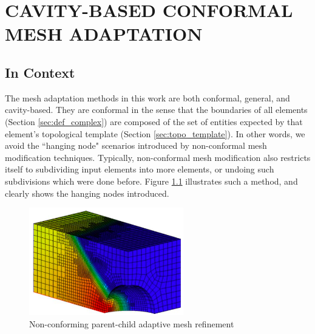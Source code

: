 
\chapter{CAVITY-BASED CONFORMAL MESH ADAPTATION}
\label{chap:adapt}

\section{In Context}

The mesh adaptation methods in this work are both
conformal, general, and cavity-based.
They are conformal in the sense that the boundaries of all
elements (Section \ref{sec:def_complex}) are composed
of the set of entities expected by that element's
topological template (Section \ref{sec:topo_template}).
In other words, we avoid the ``hanging node" scenarios
introduced by non-conformal mesh modification techniques.
Typically, non-conformal mesh modification also restricts
itself to subdividing input elements into more elements,
or undoing such subdivisions which were done before.
Figure \ref{fig:hex_amr} illustrates such a method,
and clearly shows the hanging nodes introduced.

\begin{figure}
\begin{center}
\includegraphics[width=0.6\textwidth]{hex_amr.png}
\caption{Non-conforming parent-child adaptive mesh refinement
\cite{kirk2006libmesh}}
\label{fig:hex_amr}
\end{center}
\end{figure}

